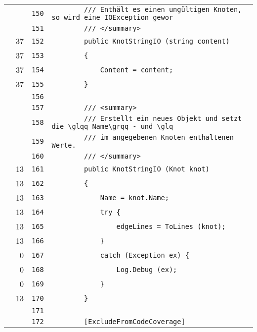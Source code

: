 \documentclass[a4paper,10pt]{article}
\begin{document}
\begin{longtable}[l]{lrrl}
\cellcolor{gray} &  & \verb~150~ & \verb~        /// Enthält es einen ungültigen Knoten, so wird eine IOException gewor~\\
\cellcolor{gray} &  & \verb~151~ & \verb~        /// </summary>~\\
\cellcolor{green} & 37 & \verb~152~ & \verb~        public KnotStringIO (string content)~\\
\cellcolor{green} & 37 & \verb~153~ & \verb~        {~\\
\cellcolor{green} & 37 & \verb~154~ & \verb~            Content = content;~\\
\cellcolor{green} & 37 & \verb~155~ & \verb~        }~\\
\cellcolor{gray} &  & \verb~156~ & \verb~~\\
\cellcolor{gray} &  & \verb~157~ & \verb~        /// <summary>~\\
\cellcolor{gray} &  & \verb~158~ & \verb~        /// Erstellt ein neues Objekt und setzt die \glqq Name\grqq - und \glq~\\
\cellcolor{gray} &  & \verb~159~ & \verb~        /// im angegebenen Knoten enthaltenen Werte.~\\
\cellcolor{gray} &  & \verb~160~ & \verb~        /// </summary>~\\
\cellcolor{green} & 13 & \verb~161~ & \verb~        public KnotStringIO (Knot knot)~\\
\cellcolor{green} & 13 & \verb~162~ & \verb~        {~\\
\cellcolor{green} & 13 & \verb~163~ & \verb~            Name = knot.Name;~\\
\cellcolor{green} & 13 & \verb~164~ & \verb~            try {~\\
\cellcolor{green} & 13 & \verb~165~ & \verb~                edgeLines = ToLines (knot);~\\
\cellcolor{green} & 13 & \verb~166~ & \verb~            }~\\
\cellcolor{red} & 0 & \verb~167~ & \verb~            catch (Exception ex) {~\\
\cellcolor{red} & 0 & \verb~168~ & \verb~                Log.Debug (ex);~\\
\cellcolor{red} & 0 & \verb~169~ & \verb~            }~\\
\cellcolor{green} & 13 & \verb~170~ & \verb~        }~\\
\cellcolor{gray} &  & \verb~171~ & \verb~~\\
\cellcolor{gray} &  & \verb~172~ & \verb~        [ExcludeFromCodeCoverage]~\\

\end{longtable}
\end{document}

